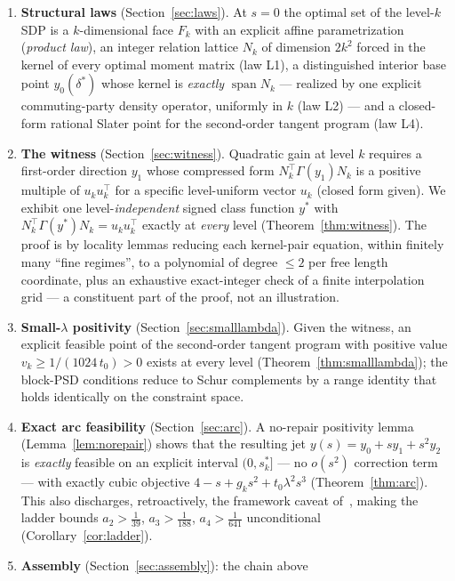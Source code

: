 \documentclass[11pt]{article}
\newcommand{\lam}{\lambda}
\DeclareMathOperator{\Span}{span}
\begin{document}
\begin{enumerate}
\item \textbf{Structural laws} (Section~\ref{sec:laws}). At $s=0$ the
  optimal set of the level-$k$ SDP is a $k$-dimensional face $F_k$ with an
  explicit affine parametrization (\emph{product law}), an integer relation
  lattice $N_k$ of dimension $2k^2$ forced in the kernel of every optimal
  moment matrix (law L1), a distinguished interior base point $y_0(\delta^\ast)$
  whose kernel is \emph{exactly} $\Span N_k$ --- realized by one explicit
  commuting-party density operator, uniformly in $k$ (law L2) --- and a
  closed-form rational Slater point for the second-order tangent program
  (law L4).
\item \textbf{The witness} (Section~\ref{sec:witness}). Quadratic gain at
  level $k$ requires a first-order direction $y_1$ whose compressed form
  $N_k^\top\Gamma(y_1)N_k$ is a positive multiple of $u_ku_k^\top$ for a
  specific level-uniform vector $u_k$ (closed form given). We exhibit one
  level-\emph{independent} signed class function $y^\ast$ with
  $N_k^\top\Gamma(y^\ast)N_k=u_ku_k^\top$ exactly at \emph{every} level
  (Theorem~\ref{thm:witness}). The proof is by locality lemmas reducing each
  kernel-pair equation, within finitely many ``fine regimes'', to a
  polynomial of degree $\le2$ per free length coordinate, plus an exhaustive
  exact-integer check of a finite interpolation grid --- a constituent part
  of the proof, not an illustration.
\item \textbf{Small-$\lambda$ positivity} (Section~\ref{sec:smalllambda}).
  Given the witness, an explicit feasible point of the second-order tangent
  program with positive value $v_k\ge1/(1024\,t_0)>0$ exists at every level
  (Theorem~\ref{thm:smalllambda}); the block-PSD conditions reduce to Schur
  complements by a range identity that holds identically on the constraint
  space.
\item \textbf{Exact arc feasibility} (Section~\ref{sec:arc}). A no-repair
  positivity lemma (Lemma~\ref{lem:norepair}) shows that the resulting jet
  $y(s)=y_0+sy_1+s^2y_2$ is \emph{exactly} feasible on an explicit interval
  $(0,s^\ast_k]$ --- no $o(s^2)$ correction term --- with exactly cubic
  objective $4-s+g_ks^2+t_0\lam^2s^3$ (Theorem~\ref{thm:arc}). This also
  discharges, retroactively, the framework caveat of~\cite{overshoot},
  making the ladder bounds $a_2>\tfrac1{39}$, $a_3>\tfrac1{188}$,
  $a_4>\tfrac1{641}$ unconditional (Corollary~\ref{cor:ladder}).
\item \textbf{Assembly} (Section~\ref{sec:assembly}): the chain above

\end{enumerate}
\end{document}
